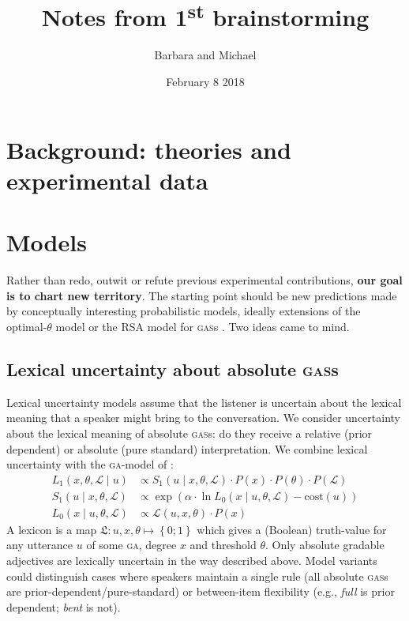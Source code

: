 \documentclass[fleqn,reqno,10pt]{article}
\title{Notes from 1\textsuperscript{st} brainstorming}
\author{Barbara and Michael}
\date{February 8 2018}
\newcommand{\acro}[1]{{\relsize{+1}\textsc{#1}}\xspace}
\newcommand{\acros}[1]{{\relsize{+1}\textsc{#1}}{\relsize{-1}s}\xspace}
\newcommand{\ga}{\acro{ga}}    %
\newcommand{\gas}{\acros{gas}} %
\newcommand{\set}[1]{\left\{#1\right\}}
\begin{document}
\maketitle

\section{Background: theories and experimental data}
\label{sec:backgr-theor-exper}

\section{Models}

Rather than redo, outwit or refute previous experimental contributions, \textbf{our goal is to
  chart new territory}. The starting point should be new predictions made by conceptually
interesting probabilistic models, ideally extensions of the optimal-$\theta$ model or the RSA
model for \gas
\citep{QingFranke2014:Meaning-and-Use,QingFranke2014:Gradable-Adject,LassiterGoodman2015:Adjectival-vagu}. Two
ideas came to mind.

\subsection{Lexical uncertainty about absolute \gas}

Lexical uncertainty models
\citep{BergenLevy2012:Thats-what-she-,PottsLassiter2016:Embedded-implic,BergenLevy2014:Pragmatic-Reaso}
assume that the listener is uncertain about the lexical meaning that a speaker might bring to
the conversation. We consider uncertainty about the lexical meaning of absolute \gas: do they
receive a relative (prior dependent) or absolute (pure standard) interpretation. We combine
lexical uncertainty with the \ga-model of \citet{LassiterGoodman2015:Adjectival-vagu}
\citep[exactly what][did too]{TesslerFranke2018:Not-unreasonabl}:
\begin{align}
L_{1}(x, \theta, \mathcal{L} \mid u) &\propto S_{1}(u \mid x, \theta, \mathcal{L}) \cdot P(x) \cdot  P(\theta) \cdot P(\mathcal{L}) \label{eq:L1} \\
S_{1}(u \mid x, \theta, \mathcal{L}) &\propto \exp{(\alpha \cdot \ln {L_{0}(x \mid u, \theta, \mathcal{L})} - \text{cost}(u))} \label{eq:S1}\\
L_{0}(x \mid u, \theta, \mathcal{L}) &\propto \mathcal{L}(u, x, \theta) \cdot P(x) \label{eq:L0}
\end{align}
A lexicon is a map $\mathfrak{L} \colon u,x,\theta \mapsto \set{0;1}$ which gives a (Boolean)
truth-value for any utterance $u$ of some \ga, degree $x$ and threshold $\theta$. Only absolute
gradable adjectives are lexically uncertain in the way described above. Model variants could
distinguish cases where speakers maintain a single rule (all absolute \gas are
prior-dependent/pure-standard) or between-item flexibility (e.g., \emph{full} is prior
dependent; \emph{bent} is not).
\end{document}
